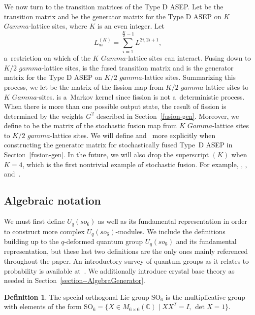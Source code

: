 \documentclass[10pt,a4paper]{amsart}
\numberwithin{equation}{section}
\theoremstyle{definition}
\newtheorem{Definition}[Theorem]{Definition}
\def\mathcal#1{#1}
\def\mathfrak#1{#1}
\def\mathsf#1{#1}
\def\Gamma{Gamma}
\def\gamma{gamma}
\begin{document}
We now turn to the transition matrices of the Type D ASEP. Let  be the transition matrix and  be the generator matrix for the Type D ASEP on $K$ $\Gamma$-lattice sites, where $K$ is an even integer. Let
\[
L^{(K)}_m = \sum_{i=1}^{\frac{K}{2}-1} L^{2i,2i+1},
\]
 a~restriction on which of the $K$ $\Gamma$-lattice sites can interact. Fusing down to $K/2$ $\gamma$-lattice sites,  is the fused transition matrix and  is the generator matrix for the Type D ASEP on $K/2$ $\gamma$-lattice sites. Summarizing this process, we let  be the matrix of the fission map from $K/2$ $\gamma$-lattice sites to $K$ $\Gamma$-sites.  is a~Markov kernel since fission is not a~deterministic process. When there is more than one possible output state, the result of fission is determined by the weights $G^2$ described in Section~\ref{fusion-gen}. Moreover, we define  to be the matrix of the stochastic fusion map from $K$ $\Gamma$-lattice sites to $K/2$ $\gamma$-lattice sites. We will define  and~ more explicitly when constructing the generator matrix for stochastically fused Type~D ASEP in Section~\ref{fusion-gen}. In the future, we will also drop the superscript $(K)$ when~${K = 4}$, which is the first nontrivial example of stochastic fusion. For example, , , and~.

\subsection{Algebraic notation} \label{algebra_defns}
We must first define $\mathcal{U}_q(\mathfrak{so}_6)$ as well as its fundamental representation in order to construct more complex $\mathcal{U}_q(\mathfrak{so}_6)$-modules. We include the definitions building up to the $q$-deformed quantum group $\mathcal{U}_q(\mathfrak{so}_6)$ and its fundamental representation, but these last two definitions are the only ones mainly referenced throughout the paper. An introductory survey of quantum groups as it relates to probability is available at~\cite{KuanQuantum}. We additionally introduce crystal base theory as needed in Section~\ref{section--AlgebraGenerator}.
\begin{Definition}
 The special orthogonal Lie group ${\mathrm{SO}}_{6}$ is the multiplicative group with elements of the form ${\mathrm{SO}}_{6} = \bigl\{ X \in M_{6 \times 6} (\mathbb{C})\mid XX^{\mathsf{T}} = I,\, \det X = 1\bigr\}$.
\end{Definition}
\end{document}
